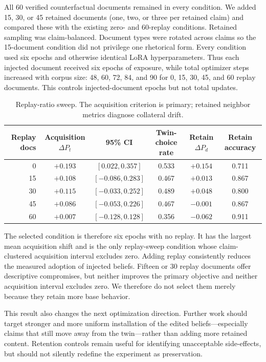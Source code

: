 \documentclass[11pt]{article}
\begin{document}
All 60 verified counterfactual documents remained in every condition. We added
15, 30, or 45 retained documents (one, two, or three per retained claim) and
compared these with the existing zero- and 60-replay conditions. Retained
sampling was claim-balanced. Document types were rotated across claims so the
15-document condition did not privilege one rhetorical form. Every condition
used six epochs and otherwise identical LoRA hyperparameters. Thus each injected
document received six epochs of exposure, while total optimizer steps increased
with corpus size: 48, 60, 72, 84, and 90 for 0, 15, 30, 45, and 60 replay
documents. This controls injected-document epochs but not total updates.

\begin{table}[h]
\centering
\begin{tabular}{rccccc}
\toprule
Replay docs & Acquisition $\Delta P_t$ & 95\% CI & Twin-choice rate &
Retain $\Delta P_d$ & Retain accuracy \\
\midrule
0  & $+0.193$ & $[0.022,0.357]$   & 0.533 & $+0.154$ & 0.711 \\
15 & $+0.108$ & $[-0.086,0.283]$  & 0.467 & $+0.013$ & 0.867 \\
30 & $+0.115$ & $[-0.033,0.252]$  & 0.489 & $+0.048$ & 0.800 \\
45 & $+0.086$ & $[-0.053,0.226]$  & 0.467 & $-0.001$ & 0.867 \\
60 & $+0.007$ & $[-0.128,0.128]$  & 0.356 & $-0.062$ & 0.911 \\
\bottomrule
\end{tabular}
\caption{Replay-ratio sweep. The acquisition criterion is primary; retained
neighbor metrics diagnose collateral drift.}
\end{table}

The selected condition is therefore six epochs with no replay. It has the
largest mean acquisition shift and is the only replay-sweep condition whose
claim-clustered acquisition interval excludes zero. Adding replay consistently
reduces the measured adoption of injected beliefs. Fifteen or 30 replay
documents offer descriptive compromises, but neither improves the primary
objective and neither acquisition interval excludes zero. We therefore do not
select them merely because they retain more base behavior.

This result also changes the next optimization direction. Further work should
target stronger and more uniform installation of the edited beliefs---especially
claims that still move away from the twin---rather than adding more retained
content. Retention controls remain useful for identifying unacceptable
side-effects, but should not silently redefine the experiment as preservation.
\end{document}
